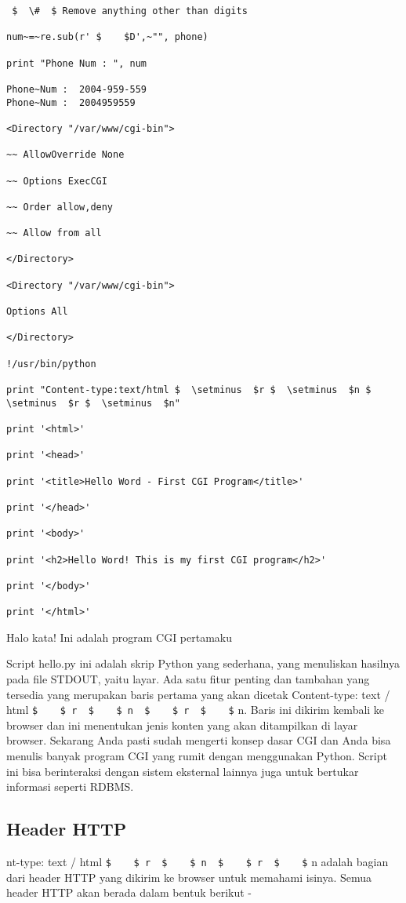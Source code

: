 \begin {enumerate}
\begin {enumerate}
\begin{verbatim}
 $  \#  $ Remove anything other than digits

num~=~re.sub(r' $    $D',~"", phone)

print "Phone Num : ", num

Phone~Num :  2004-959-559
Phone~Num :  2004959559

<Directory "/var/www/cgi-bin">

~~ AllowOverride None

~~ Options ExecCGI

~~ Order allow,deny

~~ Allow from all

</Directory>

<Directory "/var/www/cgi-bin">

Options All

</Directory>

!/usr/bin/python

print "Content-type:text/html $  \setminus  $r $  \setminus  $n $  \setminus  $r $  \setminus  $n"

print '<html>'

print '<head>'

print '<title>Hello Word - First CGI Program</title>'

print '</head>'

print '<body>'

print '<h2>Hello Word! This is my first CGI program</h2>'

print '</body>'

print '</html>'
\end{verbatim}

Halo kata! Ini adalah program CGI pertamaku

Script hello.py ini adalah skrip Python yang sederhana, yang menuliskan hasilnya pada file STDOUT, yaitu layar. Ada satu fitur penting dan tambahan yang tersedia yang merupakan baris pertama yang akan dicetak Content-type: text / html  \verb|$    $ r  $    $ n  $    $ r  $    $| n. Baris ini dikirim kembali ke browser dan ini menentukan jenis konten yang akan ditampilkan di layar browser. Sekarang Anda pasti sudah mengerti konsep dasar CGI dan Anda bisa menulis banyak program CGI yang rumit dengan menggunakan Python. Script ini bisa berinteraksi dengan sistem eksternal lainnya juga untuk bertukar informasi seperti RDBMS.

\subsection{Header HTTP}
nt-type: text / html  \verb|$    $ r  $    $ n  $    $ r  $    $| n adalah bagian dari header HTTP yang dikirim ke browser untuk memahami isinya. Semua header HTTP akan berada dalam bentuk berikut -


\end{enumerate}
\end{enumerate}
